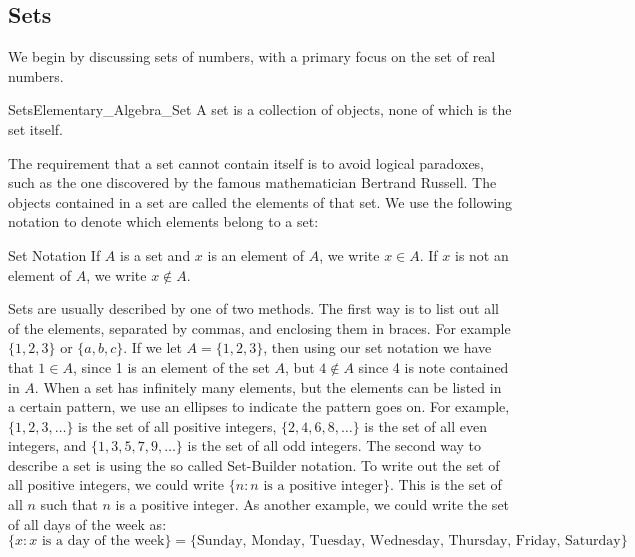 \documentclass[crop=false,class=book,oneside]{standalone}
\begin{document}
        \subsection{Sets}
            We begin by discussing sets of numbers,
            with a primary focus on the set of real numbers.
            \begin{fdefinition}{Sets}{Elementary_Algebra_Set}
                A set is a collection of objects,
                none of which is the set itself.
            \end{fdefinition}
            The requirement that a set cannot contain itself
            is to avoid logical paradoxes,
            such as the one discovered by the famous mathematician
            Bertrand Russell. The objects contained in a set are called the
            elements of that set. We use the following notation to denote
            which elements belong to a set:
            \begin{fnotation}{Set Notation}{}
                If $A$ is a set and $x$ is an element of $A$,
                we write $x\in{A}$. If $x$ is not an element of
                $A$, we write $x\notin{A}$.
            \end{fnotation}
            Sets are usually described by one of
            two methods. The first way is to list out all of the elements,
            separated by commas, and enclosing them in braces.
            For example $\{1,2,3\}$ or $\{a,b,c\}$. If we let
            $A=\{1,2,3\}$, then using our set notation we have
            that $1\in{A}$, since 1 is an element of the set $A$,
            but $4\notin{A}$ since 4 is note contained in $A$.
            When a set has infinitely many elements, but the
            elements can be listed in a certain pattern, we use an ellipses
            to indicate the pattern goes on. For example, $\{1,2,3,\hdots\}$
            is the set of all positive integers, $\{2,4,6,8,\hdots\}$ is
            the set of all even integers, and $\{1,3,5,7,9,\hdots\}$ is the
            set of all odd integers. The second
            way to describe a set is using the so called Set-Builder notation.
            To write out the set of all positive integers, we could write
            $\{n:n\textrm{ is a positive integer}\}$.
            This is the set of all $n$ such that $n$ is a
            positive integer. As another example, we could write
            the set of all days of the week as:
            \begin{equation*}
                \{x:x\textrm{ is a day of the week}\}
                =\{\textrm{Sunday, Monday, Tuesday, Wednesday,
                           Thursday, Friday, Saturday}\}
            \end{equation*}
\end{document}
